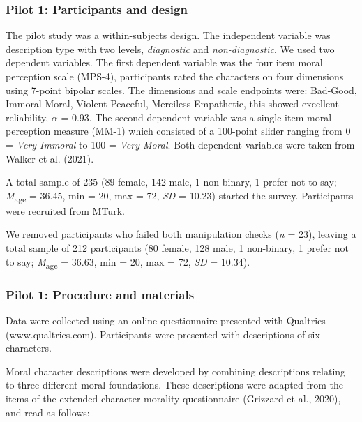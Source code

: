 \documentclass[
  man,floatsintext]{apa6}
\begin{document}
\subsubsection{Pilot 1: Participants and design}\label{pilot-1-participants-and-design}

The pilot study was a within-subjects design. The independent variable was description type with two levels, \emph{diagnostic} and \emph{non-diagnostic}. We used two dependent variables. The first dependent variable was the four item moral perception scale (MPS-4), participants rated the characters on four dimensions using 7-point bipolar scales. The dimensions and scale endpoints were: Bad-Good, Immoral-Moral, Violent-Peaceful, Merciless-Empathetic, this showed excellent reliability, \(\alpha\) = 0.93. The second dependent variable was a single item moral perception measure (MM-1) which consisted of a 100-point slider ranging from 0 = \emph{Very Immoral} to 100 = \emph{Very Moral}. Both dependent variables were taken from Walker et al. (2021).

A total sample of 235 (89 female, 142 male, 1 non-binary, 1 prefer not to say; \emph{M}\textsubscript{age} = 36.45, min = 20, max = 72, \emph{SD} = 10.23) started the survey. Participants were recruited from MTurk.

We removed participants who failed both manipulation checks (\emph{n} = 23), leaving a total sample of 212 participants (80 female, 128 male, 1 non-binary, 1 prefer not to say; \emph{M}\textsubscript{age} = 36.63, min = 20, max = 72, \emph{SD} = 10.34).

\subsubsection{Pilot 1: Procedure and materials}\label{pilot-1-procedure-and-materials}

Data were collected using an online questionnaire presented with Qualtrics (www.qualtrics.com). Participants were presented with descriptions of six characters.

Moral character descriptions were developed by combining descriptions relating to three different moral foundations. These descriptions were adapted from the items of the extended character morality questionnaire (Grizzard et al., 2020), and read as follows:
\end{document}
